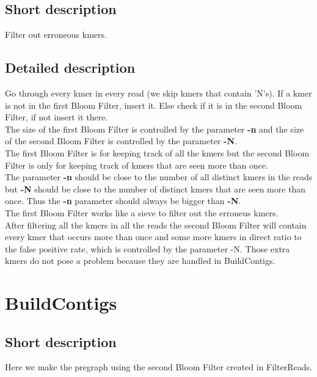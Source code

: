 \documentclass[a4paper]{report}
\renewcommand{\b}[1]{\textbf{#1}}  %
\begin{document}
\subsection{Short description}
Filter out erroneous kmers.

\subsection{Detailed description}
Go through every kmer in every read (we skip kmers that contain 'N's). If a kmer is not in the first Bloom Filter, insert it. Else check 
if it is in the second Bloom Filter, if not insert it there.\\[4pt]

The size of the first Bloom Filter is controlled by the parameter \b{-n} and the size of the second Bloom Filter
is controlled by the parameter \b{-N}.\\[4pt]

The first Bloom Filter is for keeping track of all the kmers but the second Bloom Filter
is only for keeping track of kmers that are seen more than once.\\[4pt]

The parameter \b{-n} should be close to the number of all distinct kmers in the reads but \b{-N} should be close to the
number of distinct kmers that are seen more than once. Thus the \b{-n} parameter should always be bigger than \b{-N}.\\[4pt]

The first Bloom Filter works like a sieve to filter out the erroneus kmers.\\[4pt]

After filtering all the kmers in all the reads the second Bloom Filter will contain every kmer that occurs more than once and some more kmers in direct ratio to the false positive rate, which is controlled by the parameter -N. Those extra kmers do not pose a problem because they are handled in BuildContigs.\\[4pt]

\newpage
\section{BuildContigs}

\subsection{Short description}
Here we make the pregraph using the second Bloom Filter created in FilterReads. 
\end{document}
